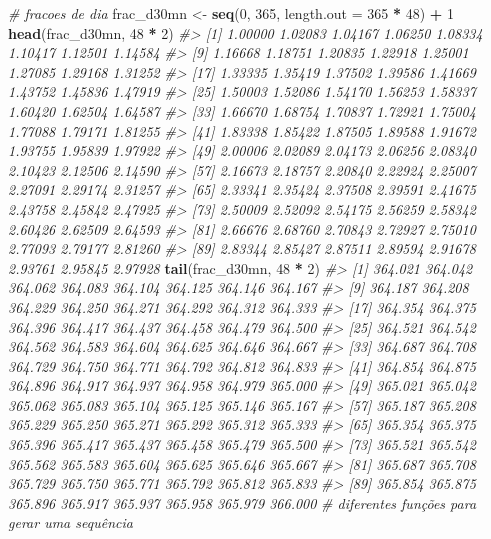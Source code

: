 \documentclass[]{book}
\newenvironment{Shaded}{\begin{snugshade}}{\end{snugshade}}
\newcommand{\KeywordTok}[1]{\textcolor[rgb]{0.13,0.29,0.53}{\textbf{#1}}}
\newcommand{\DataTypeTok}[1]{\textcolor[rgb]{0.13,0.29,0.53}{#1}}
\newcommand{\DecValTok}[1]{\textcolor[rgb]{0.00,0.00,0.81}{#1}}
\newcommand{\StringTok}[1]{\textcolor[rgb]{0.31,0.60,0.02}{#1}}
\newcommand{\CommentTok}[1]{\textcolor[rgb]{0.56,0.35,0.01}{\textit{#1}}}
\newcommand{\OperatorTok}[1]{\textcolor[rgb]{0.81,0.36,0.00}{\textbf{#1}}}
\newcommand{\NormalTok}[1]{#1}
\begin{document}
\begin{Shaded}
\begin{Highlighting}[]
\CommentTok{# fracoes de dia}
\NormalTok{frac_d30mn <-}\StringTok{ }\KeywordTok{seq}\NormalTok{(}\DecValTok{0}\NormalTok{, }\DecValTok{365}\NormalTok{, }\DataTypeTok{length.out =} \DecValTok{365} \OperatorTok{*}\StringTok{ }\DecValTok{48}\NormalTok{) }\OperatorTok{+}\StringTok{ }\DecValTok{1}
\KeywordTok{head}\NormalTok{(frac_d30mn, }\DecValTok{48} \OperatorTok{*}\StringTok{ }\DecValTok{2}\NormalTok{)}
\CommentTok{#>  [1] 1.00000 1.02083 1.04167 1.06250 1.08334 1.10417 1.12501 1.14584}
\CommentTok{#>  [9] 1.16668 1.18751 1.20835 1.22918 1.25001 1.27085 1.29168 1.31252}
\CommentTok{#> [17] 1.33335 1.35419 1.37502 1.39586 1.41669 1.43752 1.45836 1.47919}
\CommentTok{#> [25] 1.50003 1.52086 1.54170 1.56253 1.58337 1.60420 1.62504 1.64587}
\CommentTok{#> [33] 1.66670 1.68754 1.70837 1.72921 1.75004 1.77088 1.79171 1.81255}
\CommentTok{#> [41] 1.83338 1.85422 1.87505 1.89588 1.91672 1.93755 1.95839 1.97922}
\CommentTok{#> [49] 2.00006 2.02089 2.04173 2.06256 2.08340 2.10423 2.12506 2.14590}
\CommentTok{#> [57] 2.16673 2.18757 2.20840 2.22924 2.25007 2.27091 2.29174 2.31257}
\CommentTok{#> [65] 2.33341 2.35424 2.37508 2.39591 2.41675 2.43758 2.45842 2.47925}
\CommentTok{#> [73] 2.50009 2.52092 2.54175 2.56259 2.58342 2.60426 2.62509 2.64593}
\CommentTok{#> [81] 2.66676 2.68760 2.70843 2.72927 2.75010 2.77093 2.79177 2.81260}
\CommentTok{#> [89] 2.83344 2.85427 2.87511 2.89594 2.91678 2.93761 2.95845 2.97928}
\KeywordTok{tail}\NormalTok{(frac_d30mn, }\DecValTok{48} \OperatorTok{*}\StringTok{ }\DecValTok{2}\NormalTok{)}
\CommentTok{#>  [1] 364.021 364.042 364.062 364.083 364.104 364.125 364.146 364.167}
\CommentTok{#>  [9] 364.187 364.208 364.229 364.250 364.271 364.292 364.312 364.333}
\CommentTok{#> [17] 364.354 364.375 364.396 364.417 364.437 364.458 364.479 364.500}
\CommentTok{#> [25] 364.521 364.542 364.562 364.583 364.604 364.625 364.646 364.667}
\CommentTok{#> [33] 364.687 364.708 364.729 364.750 364.771 364.792 364.812 364.833}
\CommentTok{#> [41] 364.854 364.875 364.896 364.917 364.937 364.958 364.979 365.000}
\CommentTok{#> [49] 365.021 365.042 365.062 365.083 365.104 365.125 365.146 365.167}
\CommentTok{#> [57] 365.187 365.208 365.229 365.250 365.271 365.292 365.312 365.333}
\CommentTok{#> [65] 365.354 365.375 365.396 365.417 365.437 365.458 365.479 365.500}
\CommentTok{#> [73] 365.521 365.542 365.562 365.583 365.604 365.625 365.646 365.667}
\CommentTok{#> [81] 365.687 365.708 365.729 365.750 365.771 365.792 365.812 365.833}
\CommentTok{#> [89] 365.854 365.875 365.896 365.917 365.937 365.958 365.979 366.000}
\CommentTok{# diferentes funções para gerar uma sequência}

\end{Highlighting}
\end{Shaded}
\end{document}

